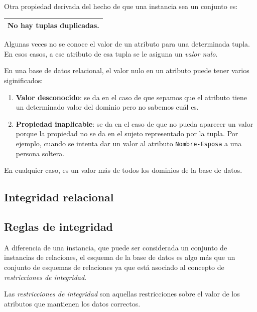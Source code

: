 \documentclass[10pt,a4paper,spanish]{report}
\begin{document}
Otra propiedad derivada del hecho de que una instancia sea un conjunto es:

\begin{center}
\begin{tabular}{p{6cm}}
\hline
No hay tuplas duplicadas. \\
\hline
\end{tabular}
\end{center}

Algunas veces no se conoce el  valor de un atributo para una determinada tupla. En esos casos, a ese atributo de esa tupla se le asiguna un \textit{\textcolor[rgb]{1,0.2,0.3}{valor nulo}}.

En una base de datos relacional, el valor nulo en un atributo puede tener varios siginificados:
\begin{enumerate}[$\heartsuit$]
    \item \textbf{\textcolor[rgb]{1,0.2,0.3}{Valor desconocido}}: se da en el caso de que sepamos que el atributo tiene un determinado valor del dominio pero no sabemos cuál es.
    \item \textcolor[rgb]{1,0.2,0.3}{\textbf{Propiedad inaplicable}}: se da en el caso de que no pueda aparecer un valor porque la propiedad no se da en el sujeto representado por la tupla. Por ejemplo, cuando se intenta dar un valor al atributo \verb*|Nombre-Esposa| a una persona soltera.
\end{enumerate}

En cualquier caso, es un valor más de todos los dominios de la base de datos.

\textcolor[rgb]{1,0.2,0.3}{\section{Integridad relacional}}
\textcolor[rgb]{1,0.2,0.3}{\subsection{Reglas de integridad}}
A diferencia de una instancia, que puede ser considerada un conjunto de instancias de relaciones, el esquema de la base de datos es algo más que un conjunto de esquemas de relaciones ya que está asociado al concepto de \textcolor[rgb]{1,0.2,0.3}{\textit{restricciones de integridad}}.

Las \textcolor[rgb]{1,0.2,0.3}{\textit{restricciones de integridad}} son aquellas restricciones sobre el valor de los atributos que mantienen los datos correctos.
\end{document}
